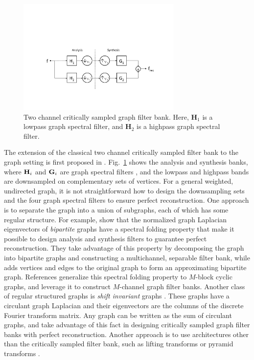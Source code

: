 \documentclass[journal, 10pt]{IEEEtran}
\begin{document}
\begin{figure}[t]
\centerline{\includegraphics[width=3.2in]{fig_two_channel_classical}}
\caption{Two channel critically sampled graph filter bank. 
Here, $\mathbf{H}_1$ is a lowpass graph spectral filter, and $\mathbf{H}_2$ is a highpass graph spectral filter.}\label{Fig:two_channel}
\end{figure}


The extension of the classical two channel critically sampled filter bank to the graph setting is first proposed in \cite{narang_icip}. Fig.\ \ref{Fig:two_channel} shows the analysis and synthesis banks, where ${\bf H}_i$ and ${\bf G}_i$ are graph spectral filters \cite{shuman2013emerging}, and the lowpass and highpass bands are downsampled on complementary sets of vertices. For a general weighted, undirected graph, it is not straightforward %
how to design the downsampling sets and the four graph spectral filters to ensure perfect reconstruction. One approach is to separate the graph into a union of subgraphs, each of which has some regular structure. For example, \cite{narang2012perfect,narang_bior_filters} show that the normalized graph Laplacian eigenvectors of \emph{bipartite} graphs have a spectral folding property that make it possible to design analysis and synthesis filters to guarantee perfect reconstruction. They take advantage of this property by decomposing the graph into bipartite graphs and constructing a multichannel, separable filter bank, while \cite{sakiyama} adds vertices and edges to the original graph to form an approximating bipartite graph. References \cite{teke2016,teke2017ii} generalize this spectral folding property to $M$-block cyclic graphs, and leverage it to construct $M$-channel graph filter banks. Another class of regular structured graphs is \emph{shift invariant} graphs \cite[Chapter 5.1]{grady}. These graphs have a circulant graph Laplacian and their eigenvectors are the columns of the discrete Fourier transform matrix. Any graph can be written as the sum of circulant graphs, and \cite{ekambaram_icip,ekambaram2013globalsip,kotzagiannidis2016icassp} take advantage of this fact in designing critically sampled graph filter banks with perfect reconstruction. Another approach is to use architectures other than the critically sampled filter bank, such as lifting transforms \cite{jansen,narang_lifting_graphs} or pyramid transforms \cite{shuman_TSP_multiscale}.
\end{document}
